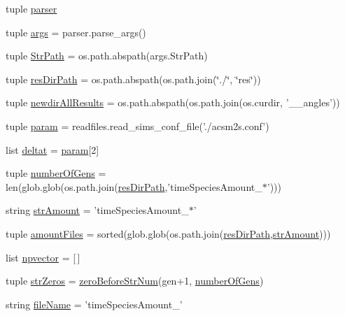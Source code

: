 \begin{DoxyCompactItemize}
\item 
tuple \hyperlink{a00090_af06690b151a135aaff10825277c4345e}{parser}
\item 
tuple \hyperlink{a00090_a5c45bb374ae578f2f1ac1f6f683491f1}{args} = parser.\-parse\-\_\-args()
\item 
tuple \hyperlink{a00090_aadf83bb83f171da2e513401ece951083}{Str\-Path} = os.\-path.\-abspath(args.\-Str\-Path)
\item 
tuple \hyperlink{a00090_a3912324aec0b455c560ebd6e192e44aa}{res\-Dir\-Path} = os.\-path.\-abspath(os.\-path.\-join(\char`\"{}./\char`\"{}, \char`\"{}res\char`\"{}))
\item 
tuple \hyperlink{a00090_ae87ac48e6ef93d79f64689af63d1681f}{newdir\-All\-Results} = os.\-path.\-abspath(os.\-path.\-join(os.\-curdir, '\-\_\-\_\-angles'))
\item 
tuple \hyperlink{a00090_ac26097b5b5657fa4d6bb0d226ffca9da}{param} = readfiles.\-read\-\_\-sims\-\_\-conf\-\_\-file('./acsm2s.\-conf')
\item 
list \hyperlink{a00090_a7edb016f9fd02abe3714165252652af6}{deltat} = \hyperlink{a00090_ac26097b5b5657fa4d6bb0d226ffca9da}{param}\mbox{[}2\mbox{]}
\item 
tuple \hyperlink{a00090_a2dc25dc1c0af14713786b9004cd602f7}{number\-Of\-Gens} = len(glob.\-glob(os.\-path.\-join(\hyperlink{a00090_a3912324aec0b455c560ebd6e192e44aa}{res\-Dir\-Path},'time\-Species\-Amount\-\_\-$\ast$')))
\item 
string \hyperlink{a00090_ab01731bd9870c6012778591010032301}{str\-Amount} = 'time\-Species\-Amount\-\_\-$\ast$'
\item 
tuple \hyperlink{a00090_a85e5d5f2db38215a8478b7c574368377}{amount\-Files} = sorted(glob.\-glob(os.\-path.\-join(\hyperlink{a00090_a3912324aec0b455c560ebd6e192e44aa}{res\-Dir\-Path},\hyperlink{a00090_ab01731bd9870c6012778591010032301}{str\-Amount})))
\item 
list \hyperlink{a00090_a5ba3601fadf52ac203118473b6c4db3e}{npvector} = \mbox{[}$\,$\mbox{]}
\item 
tuple \hyperlink{a00090_aa2b0aed68cf0d465add0d2683c686ff7}{str\-Zeros} = \hyperlink{a00090_aaf526cfff328bc58345967069b8fbae0}{zero\-Before\-Str\-Num}(gen+1, \hyperlink{a00090_a2dc25dc1c0af14713786b9004cd602f7}{number\-Of\-Gens})
\item 
string \hyperlink{a00090_adbcd9cfa3b0b922cf1d708519535f6da}{file\-Name} = 'time\-Species\-Amount\-\_\-'
\item 

\end{DoxyCompactItemize}
